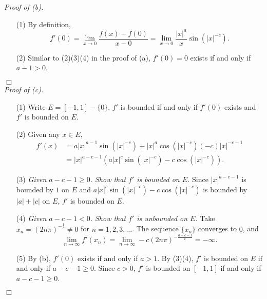 \documentclass{article}
\begin{document}
\emph{Proof of (b).}
\begin{enumerate}
  \item[(1)]
  By definition,
  \[
    f'(0)
    = \lim_{x \to 0} \frac{f(x) - f(0)}{x - 0}
    = \lim_{x \to 0} \frac{|x|^{a}}{x} \sin{(|x|^{-c})}.
  \]

  \item[(2)]
  Similar to (2)(3)(4) in the proof of (a),
  $f'(0) = 0$ exists if and only if $a - 1 > 0$.
\end{enumerate}
$\Box$ \\



\emph{Proof of (c).}
\begin{enumerate}
  \item[(1)]
  Write $E = [-1,1] - \{0\}$.
  $f'$ is bounded if and only if $f'(0)$ exists and $f'$ is bounded on $E$.

  \item[(2)]
  Given any $x \in E$,
  \begin{align*}
    f'(x)
    &= a|x|^{a-1} \sin(|x|^{-c}) + |x|^a \cos(|x|^{-c})(-c)|x|^{-c-1} \\
    &= |x|^{a-c-1} \left( a|x|^{c}\sin(|x|^{-c}) - c\cos(|x|^{-c}) \right).
  \end{align*}

  \item[(3)]
  \emph{Given $a-c-1 \geq 0$.
  Show that $f'$ is bounded on $E$.}
  Since $|x|^{a-c-1}$ is bounded by $1$ on $E$ and
  $a|x|^{c}\sin(|x|^{-c}) - c\cos(|x|^{-c})$ is bounded by $|a|+|c|$ on $E$,
  $f'$ is bounded on $E$.

  \item[(4)]
  \emph{Given $a-c-1 < 0$.
  Show that $f'$ is unbounded on $E$.}
  Take $x_n = \left( 2n\pi \right)^{-\frac{1}{c}} \neq 0$
  for $n = 1, 2, 3, \ldots$.
  The sequence $\{ x_n \}$ converges to $0$, and
  \[
    \lim_{n \to \infty} f'(x_n)
    = \lim_{n \to \infty} -c (2n\pi)^{-\frac{a-c-1}{c}}
    = -\infty.
  \]

  \item[(5)]
  By (b), $f'(0)$ exists if and only if $a > 1$.
  By (3)(4), $f'$ is bounded on $E$ if and only if $a-c-1 \geq 0$.
  Since $c > 0$, $f'$ is bounded on $[-1,1]$ if and only if $a-c-1 \geq 0$.
\end{enumerate}
$\Box$ \\



\end{document}
